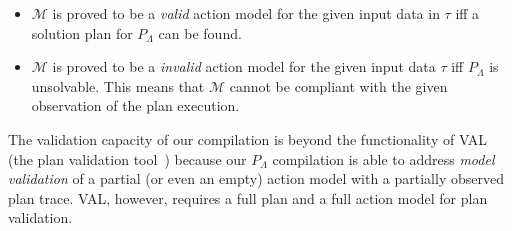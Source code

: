\begin{itemize}
	\item $\mathcal{M}$ is proved to be a {\em valid} action model for the given input data in $\tau$ iff a solution plan for $P_{\Lambda}$ can be found.
	\item $\mathcal{M}$ is proved to be a {\em invalid} action model for the given input data $\tau$ iff $P_{\Lambda}$ is unsolvable. This means that $\mathcal{M}$ cannot be compliant with the given observation of the plan execution.
\end{itemize}


The validation capacity of our compilation is beyond the functionality of VAL (the plan validation tool~\cite{howey2004val}) because our $P_{\Lambda}$ compilation is able to address {\em model validation} of a partial (or even an empty) action model with a partially observed plan trace. VAL, however, requires a full plan and a full action model for plan validation.



